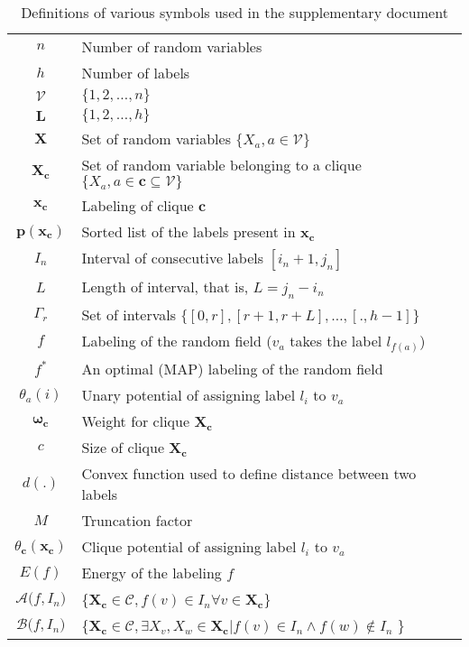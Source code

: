 \documentclass[10pt,letterpaper]{article}
\begin{document}
\begin{table}
\begin{center}
\setlength{\tabcolsep}{10pt}
\renewcommand{\arraystretch}{1.3}
\begin{tabular}{|c|l|}
\hline
$n$ & Number of random variables \\ 
$h$ & Number of labels \\ 
$\mathcal{V}$ & $\{1, 2, \dots, \mathit{n}\}$ \\
$\mathbf{L}$ &  $\{1, 2, \dots, \mathit{h}\}$ \\ 
$\mathbf{X}$ & Set of random variables $\{\mathit{X}_a, a \in \mathcal{V}\}$ \\ 
$\mathbf{X_c}$ & Set of random variable belonging to a clique $\{X_a, a \in \mathbf{c} \subseteq \mathcal{V}\}$ \\ 
$\mathbf{x_c}$ & Labeling of clique $\mathbf{c}$ \\ 
$\mathbf{p(x_c)}$ & Sorted list of the labels present in $\mathbf{x_c}$ \\ 
$\mathit{I_n}$ & Interval of consecutive labels $[i_n + 1, j_n]$ \\ 
$\mathit{L}$ & Length of interval, that is, $\mathit{L} = j_n - i_n$ \\ 
$\Gamma_r$ & Set of intervals $\{[0, r], [r + 1, r + \mathit{L}],\dots, [., h - 1]\}$ \\ 
$\mathit{f}$ & Labeling of the random field ($v_a$ takes the label $l_{f(a)}$) \\
$\mathit{f^*}$ & An optimal (MAP) labeling of the random field \\
$\mathit{\theta}_a(i)$ & Unary potential of assigning label $l_i$ to $v_a$ \\
$\mathbf{\omega_c}$ & Weight for clique $\mathbf{X_c}$ \\ 
$\mathit{c}$ & Size of clique $\mathbf{X_c}$ \\ 
$\mathit{d(.)}$ & Convex function used to define distance between two labels \\
$\mathit{M}$ & Truncation factor \\
$\mathit{\theta}_\mathbf{c}(\mathbf{x_c})$ & Clique potential of assigning label $l_i$ to $v_a$ \\
$\mathit{E(f)}$ & Energy of the labeling $f$ \\
$\mathcal{A}\mathit(f, I_n)$ & \{$\mathbf{X_c} \in \mathcal{C} , f(v) \in I_n \forall v \in \mathbf{X_c}$\} \\
$\mathcal{B}\mathit(f, I_n)$ & \{$\mathbf{X_c} \in \mathcal{C} , \exists X_v, X_w \in \mathbf{X_c} | f(v) \in I_n \land f(w) \notin I_n$ \} \\
\hline
\end{tabular}
\end{center}
\caption{Definitions of various symbols used in the supplementary document}
\end{table}
\end{document}
